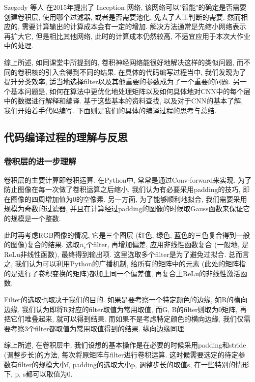 \documentclass[lang=cn, 11pt,   a4paper]{elegantpaper}
\begin{document}
Szegedy 等人 \cite{szegedy15} 在2015年提出了 Inception 网络, 该网络可以"智能"的确定是否需要创建卷积层, 使用哪个过滤器, 或者是否需要池化, 免去了人工判断的需要.  然而相应的, 需要计算输出的计算成本会有一定的增加. 解决方法通常是先缩小网络表示再扩大它, 但是相比其他网络, 此时的计算成本仍然较高, 不适宜应用于本次大作业中的处理. 

综上所述, 如同课堂中所提到的, 卷积神经网络能很好地解决这样的类似问题, 而不同的卷积核的引入会得到不同的结果. 在具体的代码编写过程当中, 我们发现为了提升分类效率, 适当地选择filter以及其他重要的参数成为了一个重要的问题. 另一个基本问题是, 如何在算法中更优化地处理矩阵以及如何具体地对CNN中的每个层中的数据进行解释和编译. 基于这些基本的资料查找, 以及对于CNN的基本了解, 我们开始着手代码编写. 下面则是我们的具体的编译过程的思考与总结. 

\subsection{代码编译过程的理解与反思}
\subsubsection{卷积层的进一步理解}
卷积层的主要计算即卷积运算. 在Python中, 常常是通过Conv-forward来实现. 为了防止图像在每一次做了卷积运算之后缩小, 我们认为有必要采用padding的技巧, 即在图像的四周增加值为0的空像素. 另一方面, 为了能够顺利地拟合, 我们需要采用规模为奇数的过滤器, 并且在计算经过padding的图像的时候取Gauss函数来保证它的规模是一个整数.
 
此时再考虑RGB图像的情况, 它是三个图层 (红色, 绿色, 蓝色的三色复合得到一般的图像)复合的结果. 选取$n_c$个filter, 再增加偏差, 应用非线性函数复合 (一般地, 是ReLu非线性函数), 最终得到输出项. 这里选取多个filter是为了避免过拟合. 总而言之, 我们认为可以利用Python的广播机制, 给所有的矩阵中的元素 (此处的矩阵指的是进行了卷积变换的矩阵)都加上同一个偏差值, 再复合上ReLu的非线性激活函数. 

Filter的选取也取决于我们的目的. 如果是要考察一个特定颜色的边缘, 如R的横向边缘, 我们认为即将R对应的filter取值为常用取值, 而G, B的filter则取为0矩阵, 再把它们堆叠起来, 就可以得到结果. 而如果不是考虑特定颜色的横向边缘, 我们仅需要考察3个filter都取值为常用取值得到的结果. 纵向边缘同理. 

综上所述, 在卷积层中, 我们设想的基本操作是在必要的时候采用padding和stride (调整步长)的方法, 每次将原矩阵与filter进行卷积运算. 这时候需要选定的待定参数有filter的规模大小f, padding的选取大小p, 调整步长的取值s, 在一些特别的情形下, p, s都可以取值为0.
\end{document}
